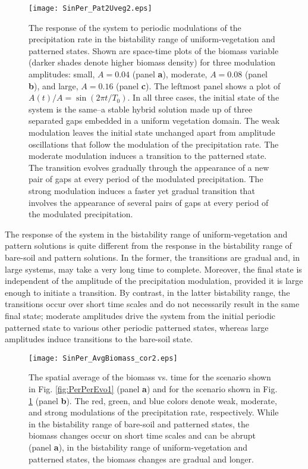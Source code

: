 \documentclass[aps,prl,preprint,superscriptaddress,floatfix]{revtex4-1}
\begin{document}
\begin{figure}
  \texttt{[image: SinPer\_Pat2Uveg2.eps]}
  \caption{The response of the system to periodic modulations of the precipitation rate in the bistability range of uniform-vegetation and patterned states. 
 Shown are space-time plots of the biomass variable (darker shades denote higher biomass density) for three modulation amplitudes: small, $A=0.04$ (panel \textbf{a}), moderate, $A=0.08$ (panel \textbf{b}), and large, $A=0.16$ (panel \textbf{c}). 
 The leftmost panel shows a plot of $A(t)/A=\sin{(2\pi t/T_0)}$.
 In all three cases, the initial state of the system is the same--a stable hybrid solution made up of three separated gaps embedded in a uniform vegetation domain. 
 The weak modulation leaves the initial state unchanged apart from amplitude oscillations that follow the modulation of the precipitation rate. 
 The moderate modulation induces a transition to the patterned state. The transition evolves gradually through the appearance of a new pair of gaps at every period of the modulated precipitation. 
 The strong modulation induces a faster yet  gradual transition that involves the appearance of several pairs of gaps at every period of the modulated precipitation.\label{fig:PerPerEvo2}}
\end{figure}

The response of the system in the bistability range of uniform-vegetation and pattern solutions is quite different from the response in the bistability range of bare-soil and pattern solutions.
In the former, the transitions are gradual and, in large systems, may take a very long time to complete. 
Moreover, the final state is independent of the amplitude of the precipitation modulation, provided it is large enough to initiate a transition. 
By contrast, in the latter bistability range, the transitions occur over short time scales and do not necessarily result in the same final state; 
moderate amplitudes drive the system from the initial periodic patterned state to various other periodic patterned states, whereas large amplitudes induce transitions to the bare-soil state.

\begin{figure}
  \texttt{[image: SinPer\_AvgBiomass\_cor2.eps]}
\caption{The spatial average of the biomass vs. time for the scenario shown in Fig. \ref{fig:PerPerEvo1} (panel \textbf{a}) and for the scenario shown in Fig. \ref{fig:PerPerEvo2} (panel \textbf{b}). 
  The red, green, and blue colors denote weak, moderate, and strong modulations of the precipitation rate, respectively. While in the bistability range of bare-soil and patterned states, 
  the biomass changes occur on short time scales and can be abrupt (panel \textbf{a}), in the bistability range of uniform-vegetation and patterned states, the biomass changes are gradual and longer.\label{fig:PerPerBio}}
  \end{figure}
\end{document}
